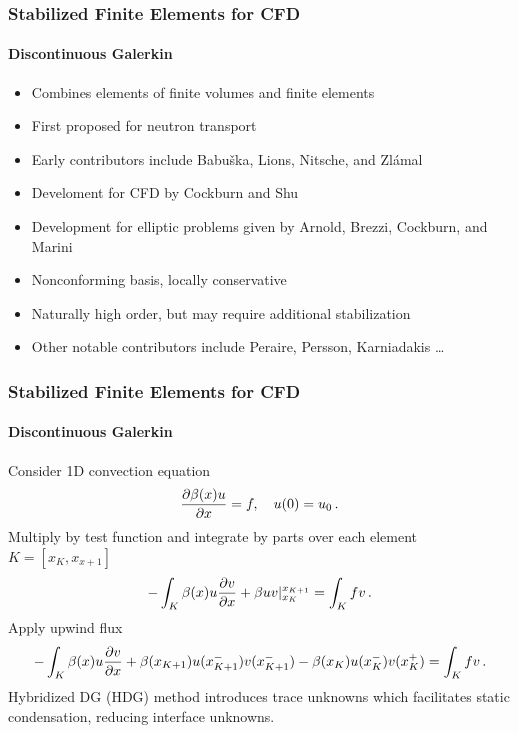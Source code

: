 \documentclass[18pt,xcolor=table]{beamer}
\begin{document}
\begin{frame}[t]
\frametitle{Stabilized Finite Elements for CFD}
\framesubtitle{Discontinuous Galerkin}
\begin{itemize}
  \item Combines elements of finite volumes and finite elements
  \item First proposed for neutron transport
  \item Early contributors include Babu\v{s}ka, Lions, Nitsche, and Zl\'{a}mal
  \item Develoment for CFD by Cockburn and Shu
  \item Development for elliptic problems given by Arnold, Brezzi, Cockburn, and Marini
  \item Nonconforming basis, locally conservative
  \item Naturally high order, but may require additional stabilization
  \item Other notable contributors include Peraire, Persson, Karniadakis \dots
\end{itemize}
\end{frame}


\begin{frame}[t]
\frametitle{Stabilized Finite Elements for CFD}
\framesubtitle{Discontinuous Galerkin}
Consider 1D convection equation
\[
\frac{\partial\beta(x)u}{\partial x}=f,\quad u(0)=u_0\,.
\]
Multiply by test function and integrate by parts over each element $K=[x_K,x_{x+1}]$
\[
-\int_K\beta(x)u\frac{\partial v}{\partial x}+\beta uv|_{x_K}^{x_{K+1}}=\int_K fv\,.
\]
Apply upwind flux
\[
-\int_K\beta(x)u\frac{\partial v}{\partial x}+\beta(x_{K+1})u(x_{K+1}^-)v(x_{K+1}^-)-\beta(x_K)u(x_K^-)v(x_K^+)=\int_K fv\,.
\]
Hybridized DG (HDG) method introduces trace unknowns which facilitates static condensation, reducing interface unknowns.
\end{frame}
\end{document}
